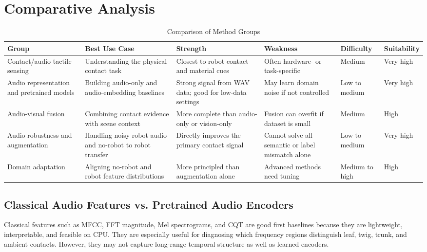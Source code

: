 \documentclass[12pt,a4paper]{article}
\begin{document}
\section{Comparative Analysis}

\begin{table}[H]
\centering
\caption{Comparison of Method Groups}
\small
\begin{tabularx}{\linewidth}{P{2.8cm}YYYYY}
\toprule
\textbf{Group} & \textbf{Best Use Case} & \textbf{Strength} & \textbf{Weakness} & \textbf{Difficulty} & \textbf{Suitability} \\
\midrule
Contact/audio tactile sensing & Understanding the physical contact task & Closest to robot contact and material cues & Often hardware- or task-specific & Medium & Very high \\
Audio representation and pretrained models & Building audio-only and audio-embedding baselines & Strong signal from WAV data; good for low-data settings & May learn domain noise if not controlled & Low to medium & Very high \\
Audio-visual fusion & Combining contact evidence with scene context & More complete than audio-only or vision-only & Fusion can overfit if dataset is small & Medium & High \\
Audio robustness and augmentation & Handling noisy robot audio and no-robot to robot transfer & Directly improves the primary contact signal & Cannot solve all semantic or label mismatch alone & Low to medium & Very high \\
Domain adaptation & Aligning no-robot and robot feature distributions & More principled than augmentation alone & Advanced methods need tuning & Medium to high & High \\
\bottomrule
\end{tabularx}
\end{table}

\subsection{Classical Audio Features vs. Pretrained Audio Encoders}

Classical features such as MFCC, FFT magnitude, Mel spectrograms, and CQT are good first baselines because they are lightweight, interpretable, and feasible on CPU. They are especially useful for diagnosing which frequency regions distinguish leaf, twig, trunk, and ambient contacts. However, they may not capture long-range temporal structure as well as learned encoders.
\end{document}
